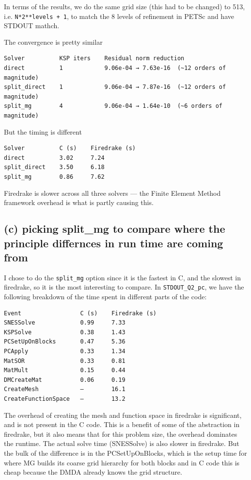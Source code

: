 \documentclass[12pt]{article}
\begin{document}
In terms of the results, we do the same grid size (this had to be changed) to 513, i.e. \texttt{N*2**levels + 1}, to match the 8 levels of refinement in PETSc and have STDOUT mathch. 

The convergence is pretty similar
\begin{verbatim}
Solver          KSP iters    Residual norm reduction
direct          1            9.06e-04 → 7.63e-16  (~12 orders of magnitude)
split_direct    1            9.06e-04 → 7.87e-16  (~12 orders of magnitude)
split_mg        4            9.06e-04 → 1.64e-10  (~6 orders of magnitude)
\end{verbatim}

But the timing is different
\begin{verbatim}
Solver          C (s)    Firedrake (s)    
direct          3.02     7.24             
split_direct    3.50     6.18            
split_mg        0.86     7.62             
\end{verbatim}
Firedrake is slower across all three solvers — the Finite Element Method framework overhead is what is partly causing this. 

\subsection{(c) picking split\_mg to compare where the principle differnces in run time are coming from}

I chose to do the \texttt{split\_mg} option since it is the fastest in C, and the slowest in firedrake, so it is the most interesting to compare. In \texttt{STDOUT\_Q2\_pc}, we have the following breakdown of the time spent in different parts of the code:
\begin{verbatim}
Event                 C (s)    Firedrake (s)    
SNESSolve             0.99     7.33             
KSPSolve              0.38     1.43             
PCSetUpOnBlocks       0.47     5.36            
PCApply               0.33     1.34            
MatSOR                0.33     0.81            
MatMult               0.15     0.44            
DMCreateMat           0.06     0.19             
CreateMesh            —        16.1            
CreateFunctionSpace   —        13.2           
\end{verbatim}


The overhead of creating the mesh and function space in firedrake is significant, and is not present in the C code. This is a benefit of some of the abstraction in firedrake, but it also means that for this problem size, the overhead dominates the runtime. The actual solve time (SNESSolve) is also slower in firedrake. But the bulk of the difference is in the PCSetUpOnBlocks, which is the setup time for where MG builds its coarse grid hierarchy for both blocks and in C code this is cheap because the DMDA already knows the grid structure.
\end{document}
